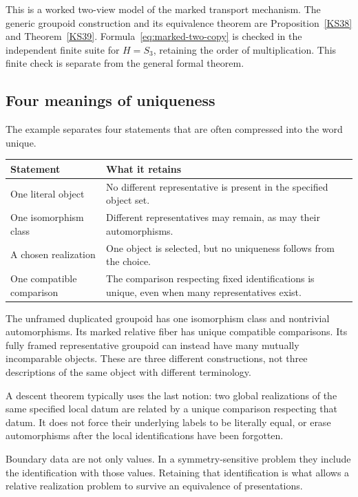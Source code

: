 This is a worked two-view model of the marked transport mechanism. The generic groupoid construction and its equivalence theorem are Proposition~\ref{KS38} and Theorem~\ref{KS39}. Formula~\eqref{eq:marked-two-copy} is checked in the independent finite suite for \(H=S_3\), retaining the order of multiplication. This finite check is separate from the general formal theorem.

\subsection{Four meanings of uniqueness}
The example separates four statements that are often compressed into the word unique.
\begin{center}
\begin{tabularx}{\linewidth}{@{}p{.28\linewidth}X@{}}
\toprule
Statement & What it retains\\
\midrule
One literal object & No different representative is present in the specified object set.\\
One isomorphism class & Different representatives may remain, as may their automorphisms.\\
A chosen realization & One object is selected, but no uniqueness follows from the choice.\\
One compatible comparison & The comparison respecting fixed identifications is unique, even when many representatives exist.\\
\bottomrule
\end{tabularx}
\end{center}
The unframed duplicated groupoid has one isomorphism class and nontrivial automorphisms. Its marked relative fiber has unique compatible comparisons. Its fully framed representative groupoid can instead have many mutually incomparable objects. These are three different constructions, not three descriptions of the same object with different terminology.

A descent theorem typically uses the last notion: two global realizations of the same specified local datum are related by a unique comparison respecting that datum. It does not force their underlying labels to be literally equal, or erase automorphisms after the local identifications have been forgotten.

\begin{insight}
Boundary data are not only values. In a symmetry-sensitive problem they include the identification with those values. Retaining that identification is what allows a relative realization problem to survive an equivalence of presentations.
\end{insight}
